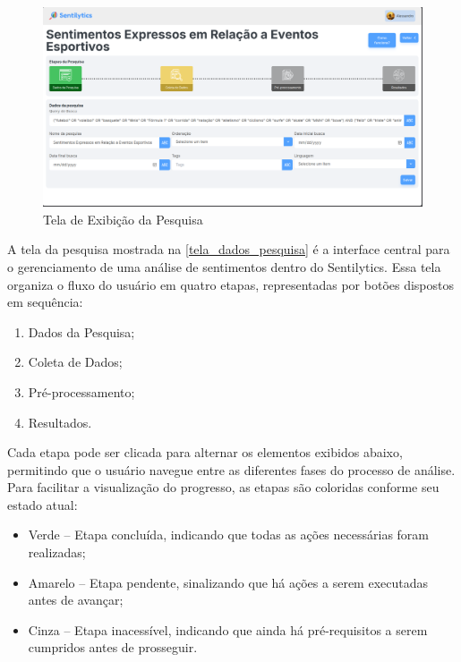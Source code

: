 \documentclass[
	12pt,				%
	oneside,			%
	a4paper,			%
	english,			%
	french,				%
	spanish,			%
	brazil				%
	]{abntex2}
\begin{document}
\begin{figure}[htbp]
\hypertarget{tela_dados_pesquisa}{%
\caption{Tela de Exibição da Pesquisa}\label{tela_dados_pesquisa}
\begin{center}
\includegraphics[scale=0.2]{imagens/sentilytics/interface-grafica/dados-pesquisa.png}
\end{center}
}
\end{figure}

A tela da pesquisa mostrada na \autoref{tela_dados_pesquisa} é a
interface central para o gerenciamento de uma análise de sentimentos
dentro do Sentilytics. Essa tela organiza o fluxo do usuário em quatro
etapas, representadas por botões dispostos em sequência:

\begin{enumerate}
\def\labelenumi{\arabic{enumi})}
\tightlist
\item
  Dados da Pesquisa;
\item
  Coleta de Dados;
\item
  Pré-processamento;
\item
  Resultados.
\end{enumerate}

Cada etapa pode ser clicada para alternar os elementos exibidos abaixo,
permitindo que o usuário navegue entre as diferentes fases do processo
de análise. Para facilitar a visualização do progresso, as etapas são
coloridas conforme seu estado atual:

\begin{itemize}
\tightlist
\item
  Verde -- Etapa concluída, indicando que todas as ações necessárias
  foram realizadas;
\item
  Amarelo -- Etapa pendente, sinalizando que há ações a serem executadas
  antes de avançar;
\item
  Cinza -- Etapa inacessível, indicando que ainda há pré-requisitos a
  serem cumpridos antes de prosseguir.
\end{itemize}
\end{document}

